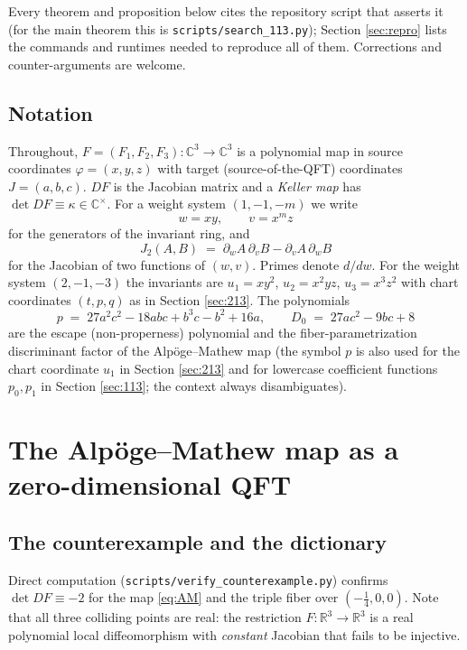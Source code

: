 \documentclass[11pt]{article}
\theoremstyle{definition}
\theoremstyle{remark}
\newcommand{\C}{\mathbb{C}}
\newcommand{\R}{\mathbb{R}}
\begin{document}
Every theorem and proposition below cites the repository script that
asserts it (for the main theorem this is
\texttt{scripts/search\_113.py}); Section \ref{sec:repro} lists the
commands and runtimes needed to reproduce all of them. Corrections and
counter-arguments are welcome.

\subsection{Notation}\label{sec:notation}

Throughout, $F=(F_1,F_2,F_3):\C^3\to\C^3$ is a polynomial map in source
coordinates $\varphi=(x,y,z)$ with target (source-of-the-QFT)
coordinates $J=(a,b,c)$. $DF$ is the Jacobian matrix and a \emph{Keller
map} has $\det DF \equiv \kappa \in \C^\times$. For a weight system
$(1,-1,-m)$ we write
\[
w = xy, \qquad v = x^m z
\]
for the generators of the invariant ring, and
\[
J_2(A,B) \;=\; \partial_w A\,\partial_v B - \partial_v A\,\partial_w B
\]
for the Jacobian of two functions of $(w,v)$. Primes denote $d/dw$. For
the weight system $(2,-1,-3)$ the invariants are $u_1=xy^2$,
$u_2=x^2yz$, $u_3=x^3z^2$ with chart coordinates $(t,p,q)$ as in Section
\ref{sec:213}. The polynomials
\[
p \;=\; 27a^2c^2 - 18abc + b^3c - b^2 + 16a, \qquad
D_0 \;=\; 27ac^2 - 9bc + 8
\]
are the escape (non-properness) polynomial and the fiber-parametrization
discriminant factor of the Alp\"oge--Mathew map (the symbol $p$ is also
used for the chart coordinate $u_1$ in Section \ref{sec:213} and for
lowercase coefficient functions $p_0,p_1$ in Section \ref{sec:113}; the
context always disambiguates).

\section{The Alp\"oge--Mathew map as a zero-dimensional QFT}
\label{sec:qft}

\subsection{The counterexample and the dictionary}

Direct computation (\texttt{scripts/verify\_counterexample.py}) confirms
$\det DF \equiv -2$ for the map \eqref{eq:AM} and the triple fiber over
$(-\tfrac14,0,0)$. Note that all three colliding points are real: the
restriction $F:\R^3\to\R^3$ is a real polynomial local diffeomorphism
with \emph{constant} Jacobian that fails to be injective.
\end{document}

